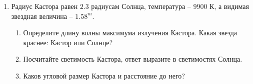 \documentclass[12pt]{article}
\begin{document}
\begin{enumerate}
        \item Радиус Кастора равен $2.3$ радиусам Солнца, температура -- $9900$ К, а видимая звездная величина -- $1.58^m$.
        \begin{enumerate}
            \item Определите длину волны максимума излучения Кастора. Какая звезда краснее: Кастор или Солнце?
            \item Посчитайте светимость Кастора, ответ выразите в светимостях Солнца.
            \item Каков угловой размер Кастора и расстояние до него?
        \end{enumerate}
 \end{enumerate}
\end{document}
